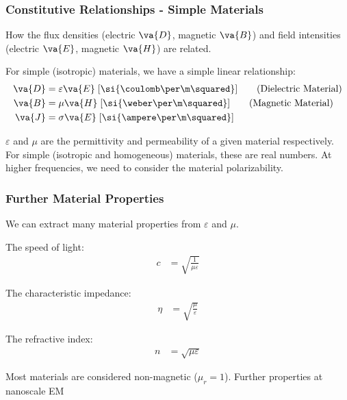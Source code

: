 \documentclass[10pt, compress]{beamer}
\newcommand{\E}{\varepsilon}  %
\renewcommand{\u}{\mu}  %
\begin{document}
\begin{frame}
  \frametitle{Constitutive Relationships - Simple Materials}
    How the flux densities (electric $\va{D}$, magnetic $\va{B}$) and field intensities (electric $\va{E}$, magnetic $\va{H}$) are related.

  For simple (isotropic) materials, we have a simple linear relationship:
  \begin{align*}
    \va{D} &= \E \va{E} \; [\si{\coulomb \per \m \squared}] \tag{Dielectric Material} \\
    \va{B} &= \u \va{H} \; [\si{\weber \per \m \squared}] \tag{Magnetic Material} \\
    \va{J} &= \sigma \va{E} \; [\si{\ampere \per \m \squared}]
  \end{align*}
  \begin{outline}
    \1 $\E$ and $\u$ are the permittivity and permeability of a given material respectively. For simple (isotropic and homogeneous) materials, these are real numbers.
    \1 At higher frequencies, we need to consider the material polarizability.
  \end{outline}

\end{frame}
\begin{frame}
  \frametitle{Further Material Properties}

\begin{outline}
  \1 We can extract many material properties from $\E$ and $\u$.
\end{outline}
The speed of light:
  \begin{align*}
    c &= \sqrt{\frac{1}{\u \E}}
  \end{align*}

The characteristic impedance:
\begin{align*}
    \eta &= \sqrt{\frac{\u}{\E}}
  \end{align*}

The refractive index:
\begin{align*}
    n &= \sqrt{{\u}{\E}}
  \end{align*}

  \begin{outline}
    \1 Most materials are considered non-magnetic ($\u_r = 1$).
    \1 Further properties at nanoscale EM
  \end{outline}
\end{frame}
\end{document}
